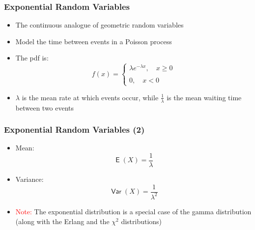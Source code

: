\documentclass[10pt]{beamer}
\DeclareMathOperator{\E}{\mathsf{E}}
\DeclareMathOperator{\var}{\mathsf{Var}}
\theoremstyle{definition}
\begin{document}
\begin{frame}[fragile]
\frametitle{Exponential Random Variables}
\begin{itemize}
	\item The continuous analogue of geometric random variables

	\item Model the time between events in a Poisson process

	\item The pdf is:
	\[
		f(x) = \left\{
		\begin{array}{l}
			\lambda e^{-\lambda x}, \quad x \geq 0\\
			\quad\\
			0, \quad x < 0
		\end{array}\right.
	\]
	
	\item $\lambda$ is the mean rate at which events occur, while $\displaystyle \frac{1}{\lambda}$ is the mean waiting time between two events
\end{itemize}
\end{frame}

\begin{frame}[fragile]
	\frametitle{Exponential Random Variables (2)}
	\begin{itemize}
		\item Mean:
		\[
			\E(X) = \dfrac{1}{\lambda}
		\]
		
		\item Variance:
		\[
			\var(X) = \dfrac{1}{\lambda^{2}}
		\]		
		
		\item \textcolor{red}{Note:} The exponential distribution is a special case of the gamma distribution (along with the Erlang and the $ \chi^{2} $ distributions)
	\end{itemize}
\end{frame}
\end{document}
